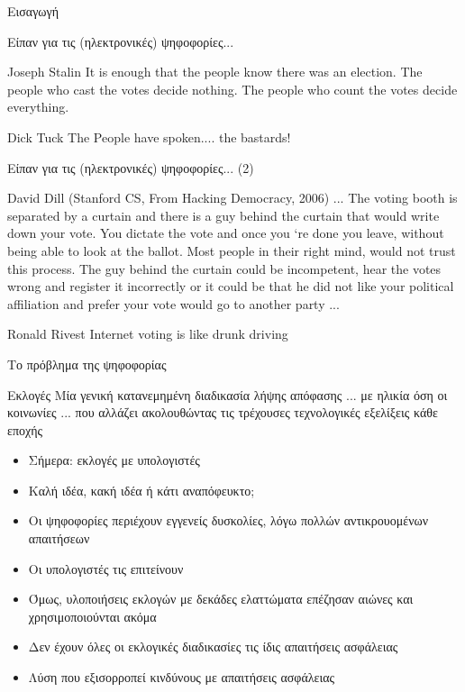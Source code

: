 \documentclass[handout]{beamer}
\begin{document}
\begin{section}{Εισαγωγή}

\begin{frame}{Είπαν για τις (ηλεκτρονικές) ψηφοφορίες...}

\begin{block}{Joseph Stalin}
It is enough that the people know there was an election. The people who cast the votes decide nothing. The people who count the votes decide everything.
\end{block}
\pause
\begin{block}{Dick Tuck}
The People have spoken.... the bastards!
\end{block}

\end{frame}

\begin{frame}{Είπαν για τις (ηλεκτρονικές) ψηφοφορίες... (2)}
\begin{block}{David Dill (Stanford CS, From Hacking Democracy, 2006)}
... The voting booth is separated by a curtain and there is a guy
behind the curtain that would write down your vote. You dictate the
vote and once you ‘re done you leave, without being able to look at 
the ballot. Most people in their right mind, would not trust this
process. The guy behind the curtain could be incompetent, hear the 
votes wrong and register it incorrectly or it could be that he did not
like your political affiliation and prefer your vote would go to
another party ...
\end{block}
\pause 
\begin{block}{Ronald Rivest}
Internet voting is like drunk driving
\end{block}

\end{frame}

\begin{frame}{Το πρόβλημα της ψηφοφορίας}
\begin{block}{Εκλογές}
   Μία γενική κατανεμημένη διαδικασία λήψης απόφασης ... με ηλικία όση οι κοινωνίες ... που αλλάζει ακολουθώντας τις τρέχουσες τεχνολογικές εξελίξεις κάθε εποχής
\end{block}
\pause
\begin{itemize}
    \item Σήμερα: εκλογές με υπολογιστές \pause
    \item Καλή ιδέα, κακή ιδέα ή κάτι αναπόφευκτο; \pause
    \item Οι ψηφοφορίες περιέχουν εγγενείς δυσκολίες, λόγω πολλών αντικρουομένων απαιτήσεων \pause
    \item Οι υπολογιστές τις επιτείνουν \pause
    \item Όμως, υλοποιήσεις εκλογών με δεκάδες ελαττώματα επέζησαν αιώνες και χρησιμοποιούνται ακόμα \pause
    \item Δεν έχουν όλες οι εκλογικές διαδικασίες τις ίδις απαιτήσεις ασφάλειας
    \item Λύση που εξισορροπεί κινδύνους με απαιτήσεις ασφάλειας
\end{itemize}
\end{frame}
\end{section}
\end{document}
